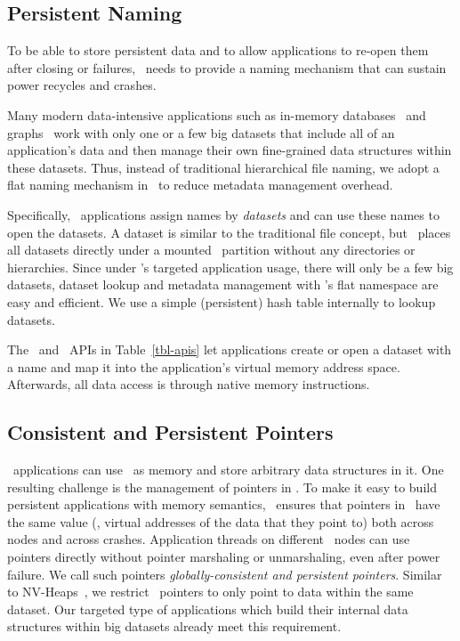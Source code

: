


\subsection{Persistent Naming}
\label{sec:naming}
To be able to store persistent data and to allow applications to re-open them after closing or failures, 
\hotpot\ needs to provide a naming mechanism that can sustain power recycles and crashes. 

Many modern data-intensive applications such as in-memory databases~\cite{MongoDB} and graphs~\cite{Gonzalez14-OSDI,Gonzalez12-OSDI}
work with only one or a few big datasets that include all of an application's data 
and then manage their own fine-grained data structures within these datasets.
Thus, instead of traditional hierarchical file naming, 
we adopt a flat naming mechanism in \hotpot\ to reduce metadata management overhead. %

Specifically, \hotpot\ applications assign names by {\em datasets}
and can use these names to open the datasets.
A dataset is similar to the traditional file concept, 
but \hotpot\ places all datasets directly under a mounted \hotpot\ partition without any directories or hierarchies.
Since under \hotpot's targeted application usage, there will only be a few big datasets,
dataset lookup and metadata management with \hotpot's flat namespace are easy and efficient.
We use a simple (persistent) hash table internally to lookup datasets. 

The \open\ and \mmap\ APIs in Table~\ref{tbl-apis} let applications create or open a dataset with a name and 
map it into the application's virtual memory address space.
Afterwards, all data access is through native memory instructions.



\subsection{Consistent and Persistent Pointers} 
\label{sec:addressing}

\hotpot\ applications can use \dsnvm\ as memory and store arbitrary data structures in it. 
One resulting challenge is the management of pointers in \dsnvm.
To make it easy to build persistent applications with memory semantics, 
\hotpot\ ensures that pointers in \dsnvm\ have the same value (\ie, virtual addresses of the data that they point to) 
both across nodes and across crashes. 
Application threads on different \hotpot\ nodes can use pointers directly without pointer marshaling or unmarshaling,
even after power failure.
We call such pointers {\em globally-consistent and persistent pointers}.
Similar to NV-Heaps~\cite{Coburn11-ASPLOS}, we restrict \dsnvm\ pointers to only point to data within the same dataset. 
Our targeted type of applications which build their internal data structures within big datasets already meet this requirement.


